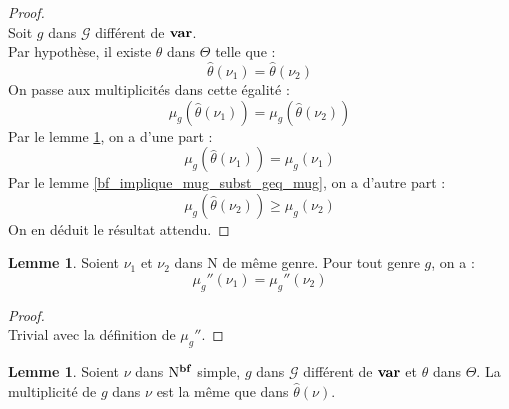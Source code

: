\documentclass[a4paper]{report}
\newenvironment{preuve} 
	{\begin{proof}~\\} 
	{\end{proof}}
\theoremstyle{definition}
\newtheorem{lemme}[theoreme]{Lemme}
\newcommand{\G}{\mathscr{G}}
\newcommand{\N}{\mathrm{N}}
\begin{document}
\begin{preuve}
	Soit $g$ dans $\G$ différent de $\bold{var}$. \\
	Par hypothèse, il existe $\theta$ dans $\Theta$ telle que :
	\[ \hat\theta (\nu_1) = \hat\theta (\nu_2) \]
	On passe aux multiplicités dans cette égalité :
	\[ \mu_g (\hat\theta (\nu_1)) = \mu_g (\hat\theta (\nu_2)) \]
	Par le lemme \ref{bf_simple_implique_mu_eq_mu_subst}, on a d'une part :
	\[ \mu_g (\hat\theta (\nu_1)) = \mu_g (\nu_1) \]
	Par le lemme \ref{bf_implique_mug_subst_geq_mug}, on a d'autre part :
	\[ \mu_g (\hat\theta (\nu_2)) \geqslant \mu_g (\nu_2) \]
	On en déduit le résultat attendu.
\end{preuve}

\begin{lemme} \label{genre_eq_implique_mug''_eq}
	Soient $\nu_1$ et $\nu_2$ dans $\N$ de même genre. Pour tout genre $g$, on a :
	\[ \mu_g'' (\nu_1) = \mu_g'' (\nu_2) \]
\end{lemme}

\begin{preuve}
	Trivial avec la définition de $\mu_g''$.
\end{preuve}

\begin{lemme} \label{bf_simple_implique_mu_eq_mu_subst}
	Soient $\nu$ dans $\N^{\bold{bf}}$ simple, $g$ dans $\G$ différent de $\bold{var}$ et $\theta$ dans $\Theta$. La multiplicité de $g$ dans $\nu$ est la même que dans $\hat\theta (\nu)$.
\end{lemme}
\end{document}
